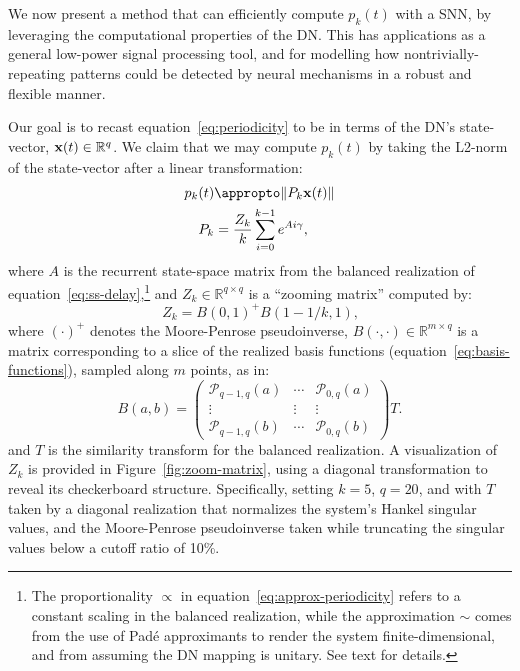We now present a method that can efficiently compute $p_k(t)$ with a SNN, by leveraging the computational properties of the DN.
This has applications as a general low-power signal processing tool, and for modelling how nontrivially-repeating patterns could be detected by neural mechanisms in a robust and flexible manner.

Our goal is to recast equation~\ref{eq:periodicity} to be in terms of the DN's state-vector, $\mathbf{x}(t) \in \mathbb{R}^q$.
We claim that we may compute $p_k(t)$ by taking the L2-norm of the state-vector after a linear transformation:
\begin{align} \label{eq:approx-periodicity}
p_k(t) &\appropto \| P_k \V{x}(t) \| \\
P_k &= \frac{Z_k}{k} \sum_{i=0}^{k-1} e^{A i \gamma} \text{,} \label{eq:periodicity-matrix}
\end{align}
where $A$ is the recurrent state-space matrix from the balanced realization of equation~\ref{eq:ss-delay},\footnote{%
The proportionality $\propto$ in equation~\ref{eq:approx-periodicity} refers to a constant scaling in the balanced realization, while the approximation $\sim$ comes from the use of Pad\'e approximants to render the system finite-dimensional, and from assuming the DN mapping is unitary.
See text for details.
}
and $Z_k \in \mathbb{R}^{q \times q}$ is a ``zooming matrix'' computed by:
\begin{equation} \label{eq:zoom-matrix}
Z_k = B(0, 1)^+ B(1-1/k, 1) \text{,} %
\end{equation}
where $(\cdot)^+$ denotes the Moore-Penrose pseudoinverse, $B(\cdot, \cdot) \in \mathbb{R}^{m \times q}$ is a matrix corresponding to a slice of the realized basis functions (equation~\ref{eq:basis-functions}), sampled along $m$ points, as in:
\begin{equation}
B(a, b) = \begin{pmatrix}
\mathcal{P}_{q-1,q}(a) & \cdots & \mathcal{P}_{0,q}(a) \\
\vdots & \vdots & \vdots \\
\mathcal{P}_{q-1,q}(b) & \cdots & \mathcal{P}_{0,q}(b)
\end{pmatrix} T \text{.}
\end{equation}
and $T$ is the similarity transform for the balanced realization.
A visualization of $Z_k$ is provided in Figure~\ref{fig:zoom-matrix}, using a diagonal transformation to reveal its checkerboard structure.
Specifically, setting $k=5$, $q=20$, and with $T$ taken by a diagonal realization that normalizes the system's Hankel singular values, and the Moore-Penrose pseudoinverse taken while truncating the singular values below a cutoff ratio of 10\%.

